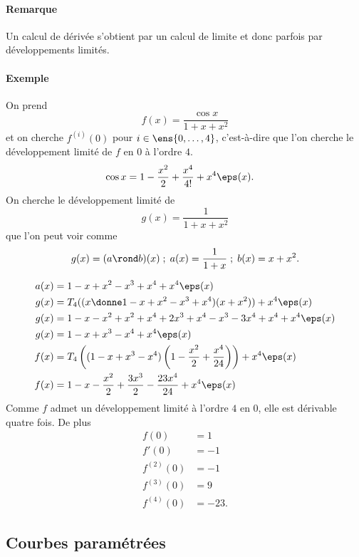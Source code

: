 \documentclass{mybourbaki}
\begin{document}
\paragraph{Remarque}Un calcul de dérivée s'obtient par un calcul de limite et donc parfois par développements limités.
\paragraph{Exemple}On prend \[ f(x) = \frac{\cos x}{1+x+x^{2}}\]et on cherche $f^{(i)}(0)$ pour $i \in \ens{0,\ldots,4}$, c'est-à-dire que l'on cherche le développement limité de $f$ en $0$ à l'ordre $4$.
\begin{align*}
\cos x &= 1 - \frac{x^{2}}{2} + \frac{x^{4}}{4!} + x^{4}\eps(x).
\end{align*}
On cherche le développement limité de \[ g(x) = \frac{1}{1+x+x^{2}}\]que l'on peut voir comme \[ g(x) = (a\rond b)(x)\; ; \; a(x) = \frac{1}{1+x} \; ; \; b(x) = x+x^{2}.\]

\begin{align*}
a(x) &= 1 - x + x^{2} - x^{3} + x^{4} + x^{4}\eps(x) \\
g(x) &= T_4((x\donne  1 - x + x^{2} - x^{3} + x^{4} )(x+x^{2})) + x^{4}\eps(x) \\
g(x) &= 1 - x - x^{2} + x^{2} + x^{4} + 2x^{3} +x^{4} - x^{3} - 3x^{4} + x^{4 }+ x^{4}\eps(x)\\
g(x) &= 1 - x + x^{3} - x^{4} + x^{4}\eps(x) \\
f(x) &= T_4\left( (1-x+x^{3}-x^{4})\left(1 - \frac{x^{2}}{2} + \frac{x^{4}}{24}\right)\right) + x^{4}\eps(x) \\
f(x) &= 1 - x -\frac{x^{2}}{2} + \frac{3x^{3}}{2} - \frac{23x^{4}}{24} + x^{4}\eps(x)
\end{align*}
Comme $f$ admet un développement limité à l'ordre $4$ en $0$, elle est dérivable quatre fois. De plus 
\begin{align*}
f(0) &= 1 \\
f'(0) &= -1 \\
f^{(2)}(0) &= -1 \\
f^{(3)}(0) &= 9 \\
f^{(4)}(0) &= -23.
\end{align*}

\subsection{Courbes paramétrées}
\end{document}
